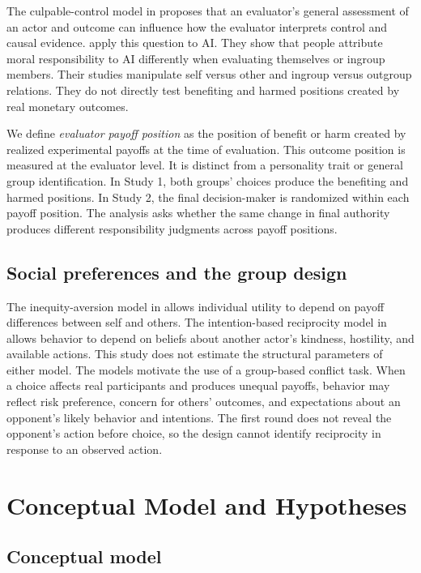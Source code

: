 \documentclass[11pt,a4paper]{article}
\newcommand{\term}[1]{\textit{#1}}
\begin{document}
The culpable-control model in \citet{Alicke2000} proposes that an evaluator's general assessment of an actor and outcome can influence how the evaluator interprets control and causal evidence. \citet{DongBocian2024} apply this question to AI. They show that people attribute moral responsibility to AI differently when evaluating themselves or ingroup members. Their studies manipulate self versus other and ingroup versus outgroup relations. They do not directly test benefiting and harmed positions created by real monetary outcomes.

We define \term{evaluator payoff position} as the position of benefit or harm created by realized experimental payoffs at the time of evaluation. This outcome position is measured at the evaluator level. It is distinct from a personality trait or general group identification. In Study 1, both groups' choices produce the benefiting and harmed positions. In Study 2, the final decision-maker is randomized within each payoff position. The analysis asks whether the same change in final authority produces different responsibility judgments across payoff positions.

\subsection{Social preferences and the group design}

The inequity-aversion model in \citet{FehrSchmidt1999} allows individual utility to depend on payoff differences between self and others. The intention-based reciprocity model in \citet{Rabin1993} allows behavior to depend on beliefs about another actor's kindness, hostility, and available actions. This study does not estimate the structural parameters of either model. The models motivate the use of a group-based conflict task. When a choice affects real participants and produces unequal payoffs, behavior may reflect risk preference, concern for others' outcomes, and expectations about an opponent's likely behavior and intentions. The first round does not reveal the opponent's action before choice, so the design cannot identify reciprocity in response to an observed action.

\section{Conceptual Model and Hypotheses}

\subsection{Conceptual model}
\end{document}
